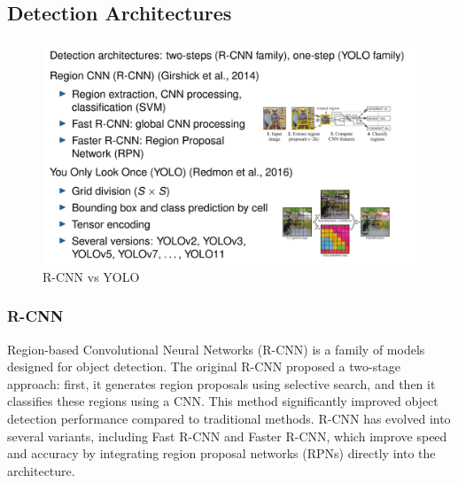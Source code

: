 

\subsection{Detection Architectures}
\begin{figure}[htbp]
   \centering
   \includegraphics{images/10/detectionArch.png }
   \caption{R-CNN vs YOLO}
   \label{fig:10/detectionArch}
\end{figure}

\subsubsection{R-CNN}
Region-based Convolutional Neural Networks (R-CNN) is a family of models designed for object detection. The original R-CNN proposed a two-stage approach: first, it generates region proposals using selective search, and then it classifies these regions using a CNN. This method significantly improved object detection performance compared to traditional methods.
R-CNN has evolved into several variants, including Fast R-CNN and Faster R-CNN, which improve speed and accuracy by integrating region proposal networks (RPNs) directly into the architecture.

